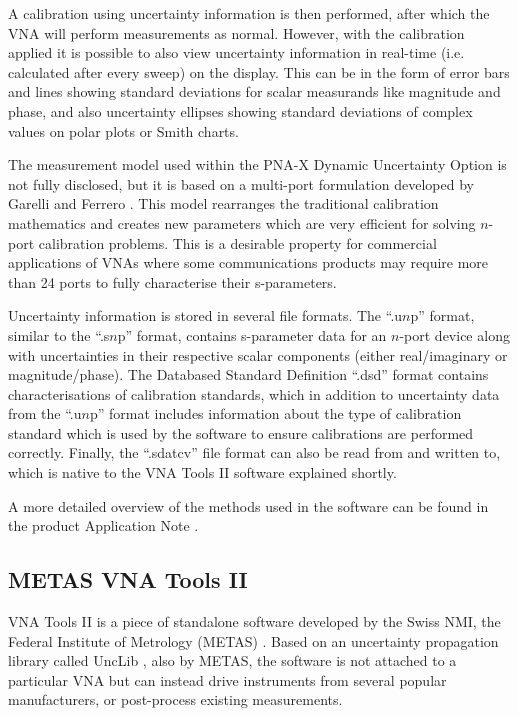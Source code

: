\documentclass[../thesis/thesis.tex]{subfiles}
\begin{document}
A calibration using uncertainty information is then performed, after which the VNA will perform measurements as normal. However, with the calibration applied it is possible to also view uncertainty information in real-time (i.e. calculated after every sweep) on the display. This can be in the form of error bars and lines showing standard deviations for scalar measurands like magnitude and phase, and also uncertainty ellipses showing standard deviations of complex values on polar plots or Smith charts.

The measurement model used within the PNA-X Dynamic Uncertainty Option is not fully disclosed, but it is based on a multi-port formulation developed by Garelli and Ferrero \cite{Garelli_2012}. This model rearranges the traditional calibration mathematics and creates new parameters which are very efficient for solving $n$-port calibration problems. This is a desirable property for commercial applications of VNAs where some communications products may require more than 24 ports to fully characterise their s-parameters.

Uncertainty information is stored in several file formats. The ``.u$n$p'' format, similar to the ``.s$n$p'' format, contains s-parameter data for an $n$-port device along with uncertainties in their respective scalar components (either real/imaginary or magnitude/phase). The Databased Standard Definition ``.dsd'' format contains characterisations of calibration standards, which in addition to uncertainty data from the ``.u$n$p'' format includes information about the type of calibration standard which is used by the software to ensure calibrations are performed correctly. Finally, the ``.sdatcv'' file format can also be read from and written to, which is native to the VNA Tools II software explained shortly. 

A more detailed overview of the methods used in the software can be found in the product Application Note \cite{Keysight_2019}.

\subsection{METAS VNA Tools II}

VNA Tools II is a piece of standalone software developed by the Swiss NMI, the Federal Institute of Metrology (METAS) \cite{VNATools}. Based on an uncertainty propagation library called UncLib \cite{UncLib}, also by METAS, the software is not attached to a particular VNA but can instead drive instruments from several popular manufacturers, or post-process existing measurements.
\end{document}
